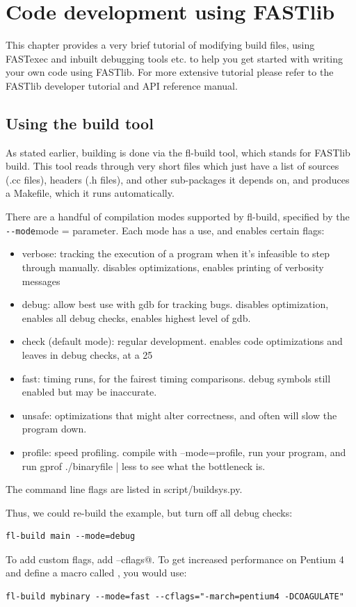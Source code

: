 \documentclass[letter]{report}
\begin{document}
\chapter {Code development using FASTlib}
 
This chapter provides a very brief tutorial of modifying build files, using FASTexec and inbuilt debugging tools etc. to help you get started with writing your own code using FASTlib. For more extensive tutorial please refer to the FASTlib developer tutorial and API reference manual.

\section {Using the build tool}

As stated earlier, building is done via the fl-build tool, which stands for FASTlib build. This tool reads through very short files which just have a list of sources (.cc files), headers (.h files), and other sub-packages it depends on, and produces a Makefile, which it runs automatically.

There are a handful of compilation modes supported by fl-build, specified by the \verb = --mode=mode = parameter. Each mode has a use, and enables certain flags:
\begin{itemize}
\item verbose: tracking the execution of a program when it's infeasible to step through manually. disables optimizations, enables printing of verbosity messages
\item debug: allow best use with gdb for tracking bugs. disables optimization, enables all debug checks, enables highest level of gdb.
\item check (default mode): regular development. enables code optimizations and leaves in debug checks, at a 25%
\item fast: timing runs, for the fairest timing comparisons. debug symbols still enabled but may be inaccurate.
\item unsafe: optimizations that might alter correctness, and often will slow the program down.
\item profile: speed profiling. compile with --mode=profile, run your program, and run gprof ./binaryfile | less to see what the bottleneck is. 
\end{itemize}
The command line flags are listed in script/buildsys.py. 

Thus, we could re-build the example, but turn off all debug checks:
\begin{verbatim}
fl-build main --mode=debug
\end{verbatim}
To add custom flags, add \verb@--cflags@. To get increased performance on Pentium 4 and define a macro called \verb@COAGULATE@, you would use:
\begin{verbatim}
fl-build mybinary --mode=fast --cflags="-march=pentium4 -DCOAGULATE"
\end{verbatim}
\end{document}
